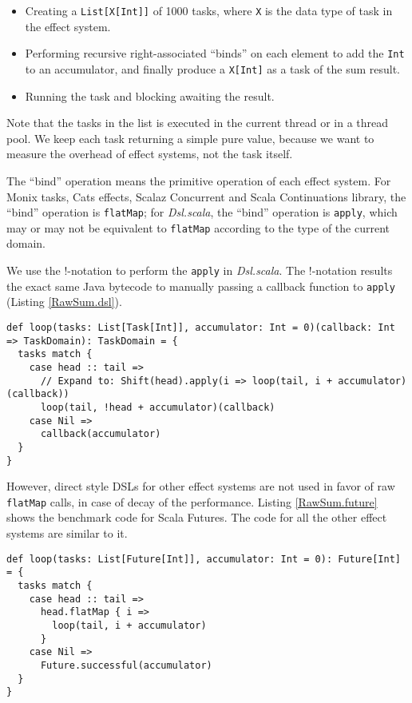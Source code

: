 \begin{itemize}
  \item Creating a \lstinline{List[X[Int]]} of 1000 tasks, where \lstinline{X} is the data type of task in the effect system.
  \item Performing recursive right-associated ``binds'' on each element to add the \lstinline{Int} to an accumulator, and finally produce a \lstinline{X[Int]} as a task of the sum result.
  \item Running the task and blocking awaiting the result.
\end{itemize}

Note that the tasks in the list is executed in the current thread or in a thread pool. We keep each task returning a simple pure value, because we want to measure the overhead of effect systems, not the task itself.

The ``bind'' operation means the primitive operation of each effect system. For Monix tasks, Cats effects, Scalaz Concurrent and Scala Continuations library, the ``bind'' operation is \lstinline{flatMap}; for \textit{Dsl.scala}, the ``bind'' operation is \lstinline{apply}, which may or may not be equivalent to \lstinline{flatMap} according to the type of the current domain.

We use the !-notation to perform the \lstinline{apply} in \textit{Dsl.scala}. The !-notation results the exact same Java bytecode to manually passing a callback function to \lstinline{apply} (Listing \ref{RawSum.dsl}).

\begin{lstlisting}[float=htbp,caption={The most efficient implementation of sum based on ordinary CPS function},label={RawSum.dsl}]
def loop(tasks: List[Task[Int]], accumulator: Int = 0)(callback: Int => TaskDomain): TaskDomain = {
  tasks match {
    case head :: tail =>
      // Expand to: Shift(head).apply(i => loop(tail, i + accumulator)(callback))
      loop(tail, !head + accumulator)(callback)
    case Nil =>
      callback(accumulator)
  }
}
\end{lstlisting}

However, direct style DSLs for other effect systems are not used in favor of raw \lstinline{flatMap} calls, in case of decay of the performance. Listing \ref{RawSum.future} shows the benchmark code for Scala Futures. The code for all the other effect systems are similar to it.

\begin{lstlisting}[float=htbp,caption={The most efficient implementation of sum based on Scala Futures},label={RawSum.future}]
def loop(tasks: List[Future[Int]], accumulator: Int = 0): Future[Int] = {
  tasks match {
    case head :: tail =>
      head.flatMap { i =>
        loop(tail, i + accumulator)
      }
    case Nil =>
      Future.successful(accumulator)
  }
}
\end{lstlisting}

